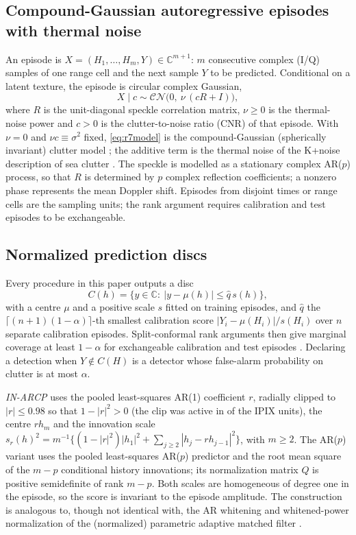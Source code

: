 \documentclass[journal]{IEEEtran}
\begin{document}
\subsection{Compound-Gaussian autoregressive episodes with thermal noise}
An episode is $X=(H_1,\dots,H_m,Y)\in\mathbb{C}^{m+1}$: $m$ consecutive complex (I/Q) samples of one range cell and the next sample $Y$ to be predicted. Conditional on a latent texture, the episode is circular complex Gaussian,
\begin{equation}
X\mid c\sim\mathcal{CN}\big(0,\ \nu\,(cR+I)\big),
\label{eq:r7model}
\end{equation}
where $R$ is the unit-diagonal speckle correlation matrix, $\nu\ge0$ is the thermal-noise power and $c>0$ is the clutter-to-noise ratio (CNR) of that episode. With $\nu=0$ and $\nu c\equiv\sigma^2$ fixed, \eqref{eq:r7model} is the compound-Gaussian (spherically invariant) clutter model \cite{conte1995,ollila2012}; the additive term is the thermal noise of the K+noise description of sea clutter \cite{watts1987,ward2013}. The speckle is modelled as a stationary complex AR($p$) process, so that $R$ is determined by $p$ complex reflection coefficients; a nonzero phase represents the mean Doppler shift. Episodes from disjoint times or range cells are the sampling units; the rank argument requires calibration and test episodes to be exchangeable.

\subsection{Normalized prediction discs}
Every procedure in this paper outputs a disc
\begin{equation}
C(h)=\{y\in\mathbb C:\ |y-\mu(h)|\le \widehat q\,s(h)\},
\label{eq:disc}
\end{equation}
with a centre $\mu$ and a positive scale $s$ fitted on training episodes, and $\widehat q$ the $\lceil(n+1)(1-\alpha)\rceil$-th smallest calibration score $|Y_i-\mu(H_i)|/s(H_i)$ over $n$ separate calibration episodes. Split-conformal rank arguments then give marginal coverage at least $1-\alpha$ for exchangeable calibration and test episodes \cite{lei2018}. Declaring a detection when $Y\notin C(H)$ is a detector whose false-alarm probability on clutter is at most $\alpha$.

\emph{IN-ARCP} uses the pooled least-squares AR(1) coefficient $r$, radially clipped to $|r|\le0.98$ so that $1-|r|^2>0$ (the clip was active in \FitClampBinding{} of the \NUnitsConf{} IPIX units), the centre $rh_m$ and the innovation scale $s_r(h)^2=m^{-1}\{(1-|r|^2)|h_1|^2+\sum_{j\ge2}|h_j-rh_{j-1}|^2\}$, with $m\ge2$. The AR($p$) variant uses the pooled least-squares AR($p$) predictor and the root mean square of the $m-p$ conditional history innovations; its normalization matrix $Q$ is positive semidefinite of rank $m-p$. Both scales are homogeneous of degree one in the episode, so the score is invariant to the episode amplitude. The construction is analogous to, though not identical with, the AR whitening and whitened-power normalization of the (normalized) parametric adaptive matched filter \cite{roman2000,michels2000}.
\end{document}
